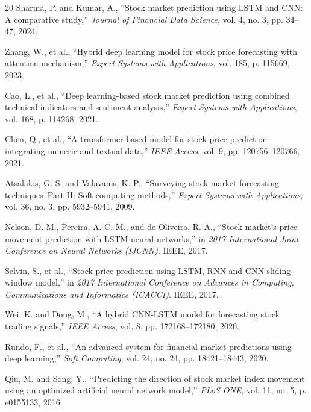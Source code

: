 \documentclass[conference]{IEEEtran}
\begin{document}
\begin{thebibliography}{20}
Sharma, P. and Kumar, A., ``Stock market prediction using LSTM and CNN: A comparative study,'' \textit{Journal of Financial Data Science}, vol. 4, no. 3, pp. 34--47, 2024.

Zhang, W., et al., ``Hybrid deep learning model for stock price forecasting with attention mechanism,'' \textit{Expert Systems with Applications}, vol. 185, p. 115669, 2023.

Cao, L., et al., ``Deep learning-based stock market prediction using combined technical indicators and sentiment analysis,'' \textit{Expert Systems with Applications}, vol. 168, p. 114268, 2021.

Chen, Q., et al., ``A transformer-based model for stock price prediction integrating numeric and textual data,'' \textit{IEEE Access}, vol. 9, pp. 120756--120766, 2021.

Atsalakis, G. S. and Valavanis, K. P., ``Surveying stock market forecasting techniques--Part II: Soft computing methods,'' \textit{Expert Systems with Applications}, vol. 36, no. 3, pp. 5932--5941, 2009.

Nelson, D. M., Pereira, A. C. M., and de Oliveira, R. A., ``Stock market's price movement prediction with LSTM neural networks,'' in \textit{2017 International Joint Conference on Neural Networks (IJCNN)}. IEEE, 2017.

Selvin, S., et al., ``Stock price prediction using LSTM, RNN and CNN-sliding window model,'' in \textit{2017 International Conference on Advances in Computing, Communications and Informatics (ICACCI)}. IEEE, 2017.

Wei, K. and Dong, M., ``A hybrid CNN-LSTM model for forecasting stock trading signals,'' \textit{IEEE Access}, vol. 8, pp. 172168--172180, 2020.

Rundo, F., et al., ``An advanced system for financial market predictions using deep learning,'' \textit{Soft Computing}, vol. 24, no. 24, pp. 18421--18443, 2020.

Qiu, M. and Song, Y., ``Predicting the direction of stock market index movement using an optimized artificial neural network model,'' \textit{PLoS ONE}, vol. 11, no. 5, p. e0155133, 2016.

\end{thebibliography}
\end{document}
